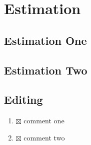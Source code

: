 \section{Estimation}

\subsection{Estimation One}


\subsection{Estimation Two}


\subsection{Editing}
\begin{enumerate}
  \item $\boxtimes$ comment one
  \item $\boxtimes$ comment two
\end{enumerate}
